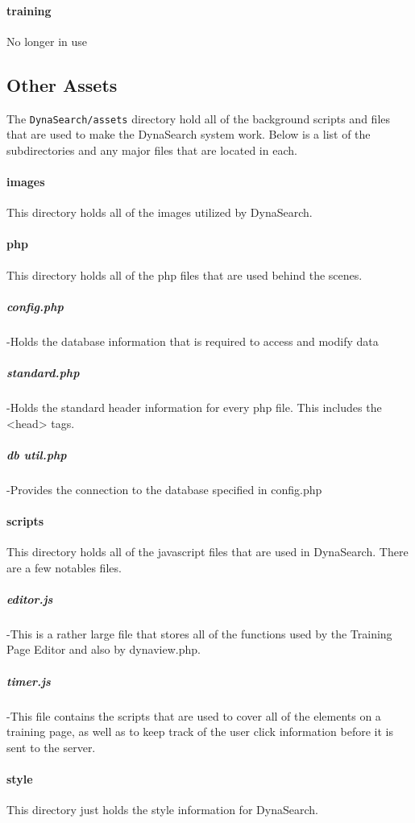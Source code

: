 \documentclass[article]{ij4uq}              %
\begin{document}
\paragraph{training}
No longer in use %

\subsection{Other Assets}
The \texttt{DynaSearch/assets} directory hold all of the background scripts and files that are used to make the DynaSearch system work. Below is a list of the subdirectories and any major files that are located in each.

\paragraph{images}
This directory holds all of the images utilized by DynaSearch.

\paragraph{php}
This directory holds all of the php files that are used behind the scenes.

\subparagraph{config.php} -Holds the database information that is required to access and modify data 

\subparagraph{standard.php} -Holds the standard header information for every php file. This includes the <head> tags. 
	
\subparagraph{db util.php} -Provides the connection to the database specified in config.php

\paragraph{scripts}
This directory holds all of the javascript files that are used in DynaSearch. There are a few notables files. 

\subparagraph{editor.js} -This is a rather large file that stores all of the functions used by the Training Page Editor and also by dynaview.php.
 	
\subparagraph{timer.js} -This file contains the scripts that are used to cover all of the elements on a training page, as well as to keep track of the user click information before it is sent to the server.

\paragraph{style}
This directory just holds the style information for DynaSearch.
\end{document}
